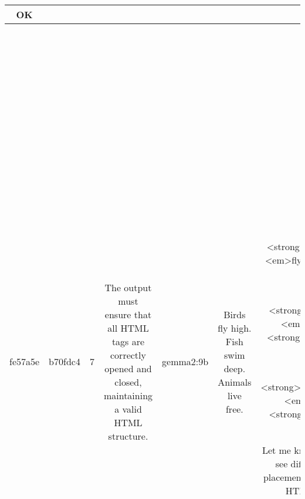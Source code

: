 \begin{table}[h!]
\begin{tabular}{|c|c|c|c|c|c|c|c|c|c|}
OK & \\
\hline
fe57a5e & b70fdc4 & 7 & The output must ensure that all HTML tags are correctly opened and closed, maintaining a valid HTML structure. & gemma2:9b & Birds fly high. Fish swim deep. Animals live free. & <p><strong>Birds</strong> <em>fly</em> **high**. </p> 

<p><strong>Fish</strong> <em>swim</em> <strong>deep</strong>. </p> 

<p><strong>Animals</strong> <em>live</em> <strong>free</strong>. </p>   


Let me know if you'd like to see different emphasis placements or explore other HTML elements! & ok & The chatbot's output includes three sentences, each wrapped in a `<p>` tag, which meets the requirement of having at least three `<p>` tags. Furthermore, within each `<p>` tag, there is at least one `<strong>` tag and one `<em>` tag, complying with the requirement to add these tags for emphasis on key words and phrases.

Therefore, there is no apparent violation of the described requirements. Each paragraph is properly formatted with the requisite HTML tags as specified.

No violation.
OK & \\
\hline
fe57a5e & b70fdc4 & 7 & The output must ensure that all HTML tags are correctly opened and closed, maintaining a valid HTML structure. & qwen2.5:3b & Birds fly high. Fish swim deep. Animals live free. & <p><strong><em>Birds</em></strong> fly <strong><em>high.</em></strong></p>
<p><strong><em>Fish</em></strong> swim <strong><em>deep.</em></strong></p>
<p><strong><em>Animals</em></strong> live <strong><em>free.</em></strong></p> & ok & Upon evaluating the output, I observe the following:

1. **Number of <p> tags**: There are three <p> tags, which meets the requirement of having at least three sentences wrapped in <p> tags.

2. **Use of <strong> and <em> tags**: Each <p> tag contains sentences where key words are wrapped with <strong> and <em> tags. Although the text might have more potential for multiple <em> tags, the description does not specify a minimum number of <em> tags, just that there should be multiple across the entire output. In each <p> tag, several words are emphasized with <strong> and <em> tags which satisfies the requirement.

There is no explicit rule violation observed in the output based on the provided description. All the required elements with <p>, <strong>, and <em> tags are present in sufficient quantity and usage.


\end{tabular}
\end{table}
